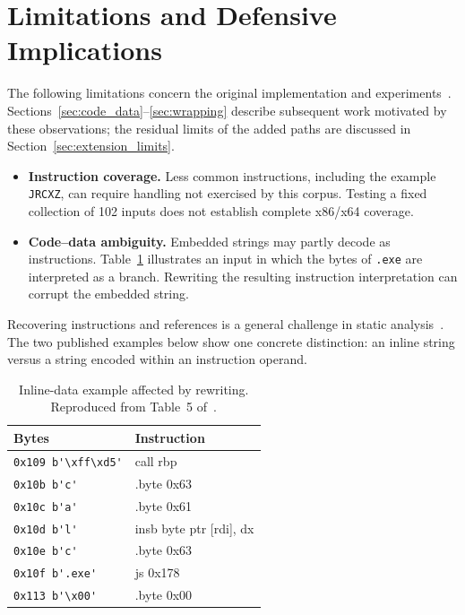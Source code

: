 \documentclass[runningheads]{llncs}
\begin{document}
\section{Limitations and Defensive Implications}\label{sec:limitations}
The following limitations concern the original implementation and experiments~\cite{zone_secrypt_2026}. Sections~\ref{sec:code_data}--\ref{sec:wrapping} describe subsequent work motivated by these observations; the residual limits of the added paths are discussed in Section~\ref{sec:extension_limits}.
\begin{itemize}
    \item \textbf{Instruction coverage.} Less common instructions, including the example \texttt{JRCXZ}, can require handling not exercised by this corpus. Testing a fixed collection of 102 inputs does not establish complete x86/x64 coverage.
    \item \textbf{Code--data ambiguity.} Embedded strings may partly decode as instructions. Table~\ref{tab:broken-payload} illustrates an input in which the bytes of \texttt{.exe} are interpreted as a branch. Rewriting the resulting instruction interpretation can corrupt the embedded string.
\end{itemize}

Recovering instructions and references is a general challenge in static
analysis~\cite{staticdisasmTuringComplete}. The two published examples
below show one concrete distinction: an inline string versus a string
encoded within an instruction operand.

\begin{table}[t]
    \caption{Inline-data example affected by rewriting. Reproduced from Table~5 of~\cite{zone_secrypt_2026}.}
    \label{tab:broken-payload}
    \small
    \centering
    \setlength{\tabcolsep}{3pt}
    \begin{tabular}{ll}
        \hline
        \textbf{Bytes}  & \textbf{Instruction} \\ \hline
        \verb|0x109 b'\xff\xd5'|  & call  rbp \\ \hline
        \verb|0x10b b'c'|         & .byte 0x63 \\ \hline
        \verb|0x10c b'a'|         & .byte 0x61 \\ \hline
        \verb|0x10d b'l'|         & insb  byte ptr [rdi], dx \\ \hline
        \verb|0x10e b'c'|         & .byte 0x63 \\ \hline
        \verb|0x10f b'.exe'|      & js    0x178 \\ \hline
        \verb|0x113 b'\x00'|      & .byte 0x00 \\ \hline
    \end{tabular}
\end{table}
\end{document}

